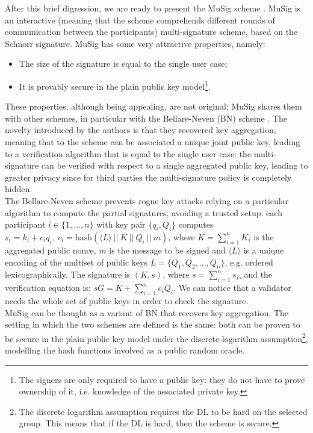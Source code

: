 \bigskip
\noindent
After this brief digression, we are ready to present the MuSig scheme \cite{RefWork:11}. MuSig is an interactive (meaning that the scheme comprehends different rounds of communication between the participants) multi-signature scheme, based on the Schnorr signature. MuSig has some very attractive properties, namely:
\begin{itemize}
	\item The size of the signature is equal to the single user case;
	\item It is provably secure in the plain public key model\footnote{The signers are only required to have a public key: they do not have to prove ownership of it, i.e. knowledge of the associated private key.}.
\end{itemize}
These properties, although being appealing, are not original: MuSig shares them with other schemes, in particular with the Bellare-Neven (BN) scheme \cite{RefWork:10}. The novelty introduced by the authors is that they recovered key aggregation, meaning that to the scheme can be associated a unique joint public key, leading to a verification algorithm that is equal to the single user case: the multi-signature can be verified with respect to a single aggregated public key, leading to greater privacy since for third parties the multi-signature policy is completely hidden.
\\
The Bellare-Neven scheme prevents rogue key attacks relying on a particular algorithm to compute the partial signatures, avoiding a trusted setup: each participant $i \in \{1, ..., n\}$ with key pair $\{q_i, Q_i\}$ computes $s_i = k_i + c_iq_i, \ c_i = \text{hash}(\langle L \rangle\ || \ K \ || \ Q_i \ || \ m)$, where $K = \sum_{i = 1}^{n}K_i$ is the aggregated public nonce, $m$ is the message to be signed and $\langle L \rangle$ is a unique encoding of the multiset of public keys $L = \{Q_1, Q_2, ..., Q_n\}$, e.g. ordered lexicographically. The signature is $(K, s)$, where $s = \sum_{i = 1}^{n}s_i$, and the verification equation is: $sG = K + \sum_{i = 1}^{n}c_iQ_i$. We can notice that a validator needs the whole set of public keys in order to check the signature. 
\\
MuSig can be thought as a variant of BN that recovers key aggregation. The setting in which the two schemes are defined is the same: both can be proven to be secure in the plain public key model under the discrete logarithm assumption\footnote{The discrete logarithm assumption requires the DL to be hard on the selected group. This means that if the DL is hard, then the scheme is secure.}, modelling the hash functions involved as a public random oracle.

